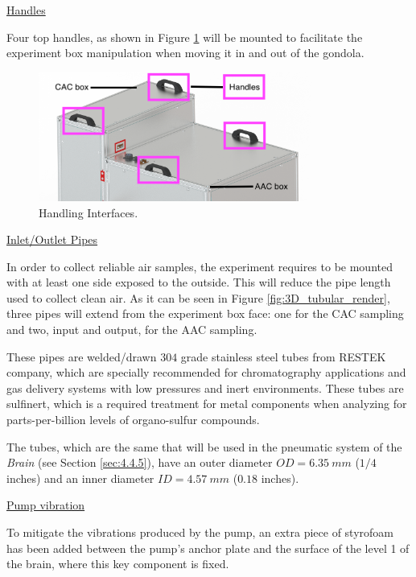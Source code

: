 \bigskip
\underline{Handles}

\smallskip
Four top handles, as shown in Figure \ref{fig:handles} will be mounted to facilitate the experiment box manipulation when moving it in and out of the gondola.

\begin{figure}[H]
    \centering
    \includegraphics[width=0.8\textwidth]{4-experiment-design/img/Mechanical/Figure_8.png}
    \caption{Handling Interfaces.}
    \label{fig:handles}
\end{figure}

\bigskip
\underline{Inlet/Outlet Pipes}
\label{subsec:pipes}

\smallskip
In order to collect reliable air samples, the experiment requires to be mounted with at least one side exposed to the outside. This will reduce the pipe length used to collect clean air. As it can be seen in Figure \ref{fig:3D_tubular_render}, three pipes will extend from the experiment box face: one for the CAC sampling and two, input and output, for the AAC sampling. 

These pipes are welded/drawn $304$ grade stainless steel tubes from RESTEK company, which are specially recommended for chromatography applications and gas delivery systems with low pressures and inert environments. These tubes are sulfinert, which is a required treatment for metal components when analyzing for parts-per-billion levels of organo-sulfur compounds.

The tubes, which are the same that will be used in the pneumatic system of the \emph{Brain} (see Section \ref{sec:4.4.5}), have an outer diameter $OD = 6.35\ mm$ ($1/4$ inches) and an inner diameter $ID = 4.57\ mm$ ($0.18$ inches).

\bigskip
\underline{Pump vibration}
\label{subsec:vibration}

To mitigate the vibrations produced by the pump, an extra piece of styrofoam has been added between the pump's anchor plate and the surface of the level 1 of the brain, where this key component is fixed. 



